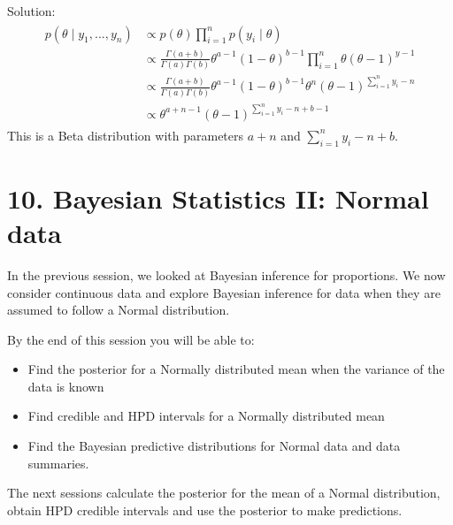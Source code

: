 \documentclass[letterpaper,10pt,english]{jupyterBook}
\begin{document}
\sphinxAtStartPar
Solution:
\begin{equation*}
\begin{split}
\begin{align*}
p(\theta \mid y_1, ..., y_n) 
         &\propto  p(\theta) \prod_{i=1}^n p(y_i \mid \theta)\\
                &\propto  \frac{\Gamma(a+ b)}{ \Gamma(a)\Gamma(b) } \theta^{a-1} (1-\theta)^{b-1} \prod_{i=1}^n \theta (\theta -1)^{y-1}\\
        &\propto  \frac{\Gamma(a+ b)}{ \Gamma(a)\Gamma(b) } \theta^{a-1} (1-\theta)^{b-1}  \theta^n (\theta -1)^{\sum_{i=1}^n y_i-n}\\
        &\propto  \theta^{a+n-1} (\theta -1)^{\sum_{i=1}^n y_i -n +b-1}
\end{align*}
\end{split}
\end{equation*}
\sphinxAtStartPar
This is a Beta distribution with parameters \(a+n\) and \(\sum_{i=1}^n y_i-n+b\).


\chapter{10. Bayesian Statistics II: Normal data}
\label{\detokenize{10.a. Bayesian Statistics II:bayesian-statistics-ii-normal-data}}\label{\detokenize{10.a. Bayesian Statistics II::doc}}
\sphinxAtStartPar
In the previous session, we looked at Bayesian inference for proportions. We now consider continuous data and explore Bayesian inference for data when they are assumed to follow a Normal distribution.



\sphinxAtStartPar
By the end of this session you will be able to:
\begin{itemize}
\item {} 
\sphinxAtStartPar
Find the posterior for a Normally distributed mean when the variance of the data is known

\item {} 
\sphinxAtStartPar
Find credible and HPD intervals for a Normally distributed mean

\item {} 
\sphinxAtStartPar
Find the Bayesian predictive distributions for Normal data and data summaries.

\end{itemize}



\sphinxAtStartPar
The next sessions calculate the posterior for the mean of a Normal distribution, obtain HPD credible intervals and use the posterior to make predictions.
\end{document}

